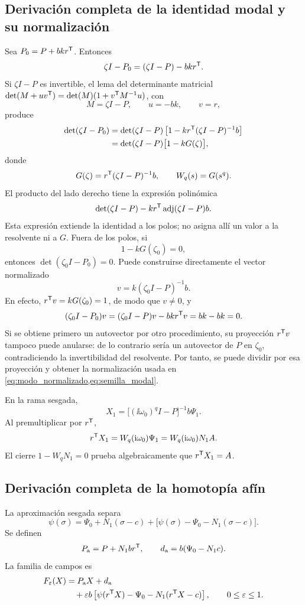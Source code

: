\fi
\ifnum{}\relax
\subsection{Derivación completa de la identidad modal y su normalización}
\label{app:identidad_modal}

Sea \(P_0=P+bkr^{\mathsf T}\). Entonces
\[
\zeta I-P_0=(\zeta I-P)-bkr^{\mathsf T}.
\]
Si \(\zeta I-P\) es invertible, el lema del determinante matricial
\(\det(M+uv^{\mathsf T})=\det(M)(1+v^{\mathsf T}M^{-1}u)\), con
\[
M=\zeta I-P,\qquad u=-bk,\qquad v=r,
\]
produce
\begin{align}
\det(\zeta I-P_0)
&=\det(\zeta I-P)
\left[1-kr^{\mathsf T}(\zeta I-P)^{-1}b\right]\nonumber\\
&=\det(\zeta I-P)\bigl[1-kG(\zeta)\bigr],
\label{eq:lema_determinante_aplicado}
\end{align}
donde
\[
G(\zeta)=r^{\mathsf T}(\zeta I-P)^{-1}b,
\qquad W_q(s)=G(s^q).
\]
El producto del lado derecho tiene la expresión polinómica
\[
 \det(\zeta I-P)-k r^{\mathsf T}\operatorname{adj}(\zeta I-P)b.
\]
Esta expresión extiende la identidad a los polos; no asigna allí un valor
a la resolvente ni a \(G\). Fuera de los polos, si
\[
1-kG(\zeta_0)=0,
\]
entonces \(\det(\zeta_0I-P_0)=0\). Puede construirse directamente el
vector normalizado
\[
 v=k(\zeta_0I-P)^{-1}b.
\]
En efecto, \(r^{\mathsf T}v=kG(\zeta_0)=1\), de modo que \(v\ne0\), y
\[
 (\zeta_0I-P_0)v
 =(\zeta_0I-P)v-bkr^{\mathsf T}v=bk-bk=0.
\]
Si se obtiene primero un autovector por otro procedimiento, su proyección
\(r^{\mathsf T}v\) tampoco puede anularse: de lo contrario sería un
autovector de \(P\) en \(\zeta_0\), contradiciendo la invertibilidad
del resolvente. Por tanto, se puede dividir por esa proyección y obtener
la normalización usada en \cref{eq:modo_normalizado,eq:semilla_modal}.

En la rama sesgada,
\[
X_1=\bigl[(\ii\omega_0)^qI-P\bigr]^{-1}b\Psi_1.
\]
Al premultiplicar por \(r^{\mathsf T}\),
\[
r^{\mathsf T}X_1
=W_q(\mathrm{i}\omega_0)\Psi_1
=W_q(\mathrm{i}\omega_0)N_1A.
\]
El cierre \(1-W_qN_1=0\) prueba algebraicamente que
\(r^{\mathsf T}X_1=A\).

\fi
\ifnum{}\relax
\subsection{Derivación completa de la homotopía afín}
\label{app:homotopia_afin}

La aproximación sesgada separa
\[
\psi(\sigma)
=\Psi_0+N_1(\sigma-c)
+\bigl[\psi(\sigma)-\Psi_0-N_1(\sigma-c)\bigr].
\]
Se definen
\begin{equation}
P_{\mathrm a}=P+N_1br^{\mathsf T},\qquad
d_{\mathrm a}=b(\Psi_0-N_1c).
\label{eq:parametros_homotopia_afin}
\end{equation}
La familia de campos es
\begin{equation}
\begin{aligned}
F_\varepsilon(X)
&=P_{\mathrm a}X+d_{\mathrm a}\\
&\quad+\varepsilon b
\left[
\psi(r^{\mathsf T}X)-\Psi_0-N_1(r^{\mathsf T}X-c)
\right],
\qquad 0\leq\varepsilon\leq1.
\end{aligned}
\label{eq:homotopia_afin}
\end{equation}


